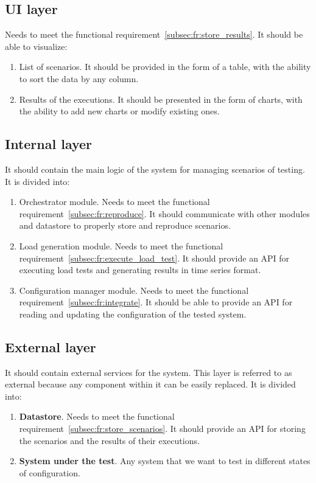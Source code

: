 \subsection{UI layer}\label{subsec:ui_layer}
Needs to meet the functional requirement~\ref{subsec:fr:store_results}.
It should be able to visualize:
\begin{enumerate}
    \item List of scenarios. It should be provided in the form of a table, with the ability to sort the data by any column.
    \item Results of the executions. It should be presented in the form of charts, with the ability to add new charts or modify existing ones.
\end{enumerate}

\subsection{Internal layer}\label{subsec:internal_layer}
It should contain the main logic of the system for managing scenarios of testing. It is divided into:
\begin{enumerate}
    \item Orchestrator module. Needs to meet the functional requirement~\ref{subsec:fr:reproduce}. It should communicate with other modules and datastore to properly store and reproduce scenarios.
    \item Load generation module. Needs to meet the functional requirement~\ref{subsec:fr:execute_load_test}. It should provide an API for executing load tests and generating results in time series format.
    \item Configuration manager module. Needs to meet the functional requirement~\ref{subsec:fr:integrate}. It should be able to provide an API for reading and updating the configuration of the tested system.
\end{enumerate}

\subsection{External layer}\label{subsec:external_layer}
It should contain external services for the system. This layer is referred to as external because any component within it can be easily replaced. It is divided into:
\begin{enumerate}
    \item \textbf{Datastore}. Needs to meet the functional requirement~\ref{subsec:fr:store_scenarios}. It should provide an API for storing the scenarios and the results of their executions.
    \item \textbf{System under the test}. Any system that we want to test in different states of configuration.
\end{enumerate}